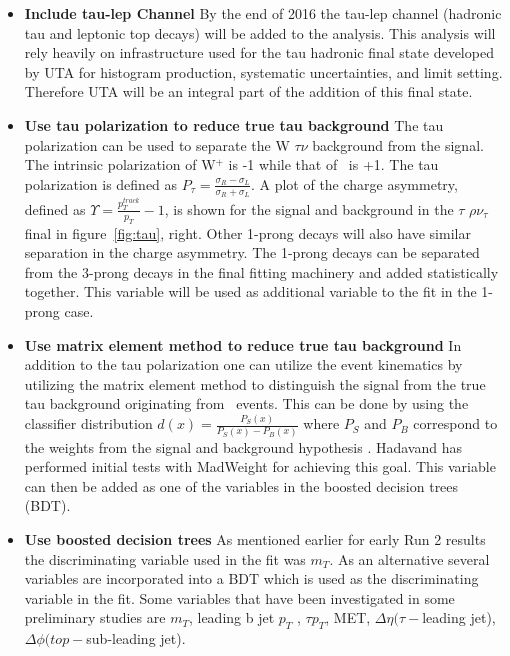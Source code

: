\begin{itemize}[noitemsep,nolistsep,leftmargin=*]
\item[]{{\bf Include tau-lep Channel}
By the end of 2016 the tau-lep channel (hadronic tau and leptonic top decays) will be added to the analysis.  This analysis will rely heavily on infrastructure used for the  tau hadronic final state developed by UTA 
for histogram production, systematic uncertainties, and limit setting. Therefore UTA will be an integral part of the addition of this final state.}

\item[]{{\bf Use tau polarization to reduce true tau background}
The tau polarization can be used to separate the W \too $\tau \nu$ background from the signal.  The intrinsic polarization of W$^+$ is -1 while that of \Hp\ is +1.  The tau polarization is defined as $P_{\tau}=\frac{\sigma_R - \sigma_L}{\sigma_R + \sigma_L}$.
A plot of the charge asymmetry, defined as $\Upsilon=\frac{p_{T}^{track}}{p_T} - 1$, is shown for the signal and background in the $\tau$ \too $\rho \nu_{\tau}$ final in figure~\ref{fig:tau}, right. Other 1-prong decays will also have similar separation in the charge asymmetry. 
The 1-prong decays can be separated from the 3-prong decays in the final fitting machinery and added statistically together.  This variable will be used as additional variable to the fit in the 1-prong case.}

\item[]{{\bf Use matrix element method to reduce true tau background}
In addition to the tau polarization one can utilize the event kinematics by utilizing the matrix element method to distinguish the signal from the true tau background originating from \ttbar\ events.  
This can be done by using the classifier distribution $d(x)=\frac{P_S(x)}{P_S(x)-P_B(x)}$ where $P_S$ and $P_B$ correspond to the weights from the signal and background 
hypothesis . Hadavand has performed initial tests with MadWeight for achieving this goal. This variable can then be added as one of the variables in the boosted decision trees (BDT). }

\item[]{{\bf Use boosted decision trees}
As mentioned earlier for early Run 2 results the discriminating variable used in the fit was $m_T$. As an alternative several 
variables are incorporated into a BDT which is used as the discriminating variable in the fit.  Some variables that have been investigated in some preliminary studies
are $m_T$, leading b jet $p_T$ , $\tau p_T$, MET, $\Delta \eta(\tau-$leading jet), $\Delta \phi(top-$sub-leading jet).}


\end{itemize}
